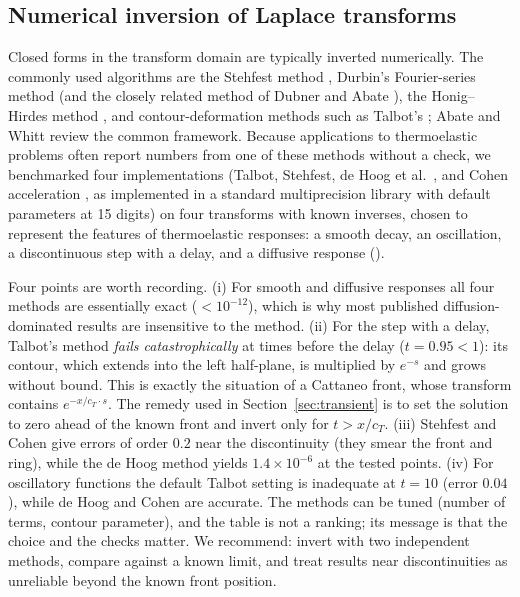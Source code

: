 \subsection{Numerical inversion of Laplace transforms}\label{sec:inversion}
Closed forms in the transform domain are typically inverted numerically. The commonly used algorithms are the Stehfest method \citep{Stehfest1970}, Durbin's Fourier-series method \citep{Durbin1974} (and the closely related method of Dubner and Abate \citep{DubnerAbate1968}), the Honig--Hirdes method \citep{HonigHirdes1984}, and contour-deformation methods such as Talbot's \citep{Talbot1979}; Abate and Whitt \citep{AbateWhitt2006} review the common framework. Because applications to thermoelastic problems often report numbers from one of these methods without a check, we benchmarked four implementations (Talbot, Stehfest, de Hoog et al.\ \citep{deHoog1982}, and Cohen acceleration \citep{Cohen2007}, as implemented in a standard multiprecision library with default parameters at 15 digits) on four transforms with known inverses, chosen to represent the features of thermoelastic responses: a smooth decay, an oscillation, a discontinuous step with a delay, and a diffusive response ().
\begin{table}[ht]\centering\small
\caption{Maximum absolute error of four numerical Laplace inversion methods on test transforms (evaluated at $t=0.5,2,5,10$; for the step at $t=0.5,0.95,1.05,2,5$). Default parameters, 15 digits. ``$4\times10^{193}$'' indicates a numerical blow-up.}\label{tab:bench}

\end{table}
Four points are worth recording. (i) For smooth and diffusive responses all four methods are essentially exact ($<10^{-12}$), which is why most published diffusion-dominated results are insensitive to the method. (ii) For the step with a delay, Talbot's method \emph{fails catastrophically} at times before the delay ($t=0.95<1$): its contour, which extends into the left half-plane, is multiplied by $e^{-s}$ and grows without bound. This is exactly the situation of a Cattaneo front, whose transform contains $e^{-x/c_T\cdot s}$. The remedy used in Section~\ref{sec:transient} is to set the solution to zero ahead of the known front and invert only for $t>x/c_T$. (iii) Stehfest and Cohen give errors of order $0.2$ near the discontinuity (they smear the front and ring), while the de Hoog method yields $1.4\times10^{-6}$ at the tested points. (iv) For oscillatory functions the default Talbot setting is inadequate at $t=10$ (error $0.04$), while de Hoog and Cohen are accurate. The methods can be tuned (number of terms, contour parameter), and the table is not a ranking; its message is that the choice and the checks matter. We recommend: invert with two independent methods, compare against a known limit, and treat results near discontinuities as unreliable beyond the known front position.

